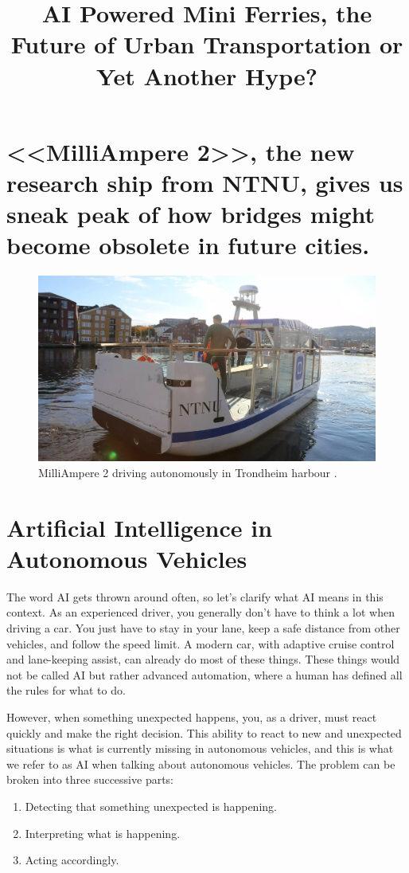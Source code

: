 \documentclass{iopconfser}
\begin{document}
\title{AI Powered Mini Ferries, the Future of Urban Transportation or Yet Another Hype?}

\section*{<<MilliAmpere 2>>, the new research ship from NTNU, gives us sneak peak of how bridges might become obsolete in future cities.}

\begin{figure}[H]
    \centering
    \includegraphics[width=\textwidth]{figures/milliampere.jpg}
    \caption{MilliAmpere 2 driving autonomously in Trondheim harbour \cite{hauglandDetSomHar2022}.}
\end{figure}

\section*{Artificial Intelligence in Autonomous Vehicles}
The word AI gets thrown around often, so let's clarify what AI means in this context.
As an experienced driver, you generally don't have to think a lot when driving a car.
You just have to stay in your lane, keep a safe distance from other vehicles, and follow the speed limit.
A modern car, with adaptive cruise control and lane-keeping assist, can already do most of these things.
These things would not be called AI but rather advanced automation, where a human has defined all the rules for what to do.

However, when something unexpected happens, you, as a driver, must react quickly and make the right decision.
This ability to react to new and unexpected situations is what is currently missing in autonomous vehicles, and this is what we refer to as AI when talking about autonomous vehicles.
The problem can be broken into three successive parts:
\begin{enumerate}
    \item Detecting that something unexpected is happening.
    \item Interpreting what is happening.
    \item Acting accordingly.
\end{enumerate}
\end{document}

